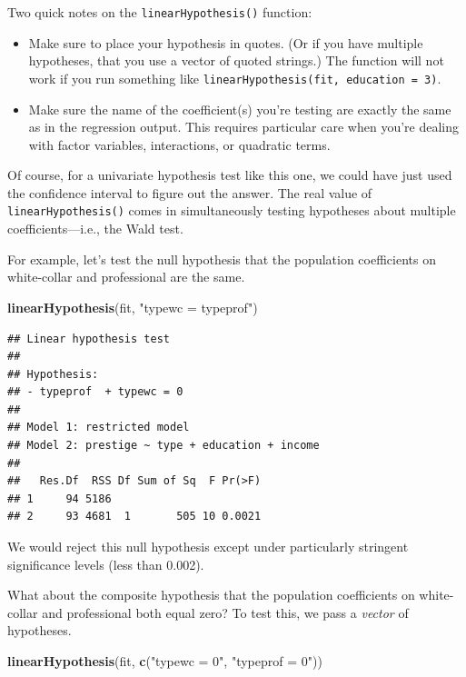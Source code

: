 \documentclass[12pt,oneside,openany]{book}
\newenvironment{Shaded}{\begin{snugshade}}{\end{snugshade}}
\newcommand{\KeywordTok}[1]{\textcolor[rgb]{0.13,0.29,0.53}{\textbf{#1}}}
\newcommand{\StringTok}[1]{\textcolor[rgb]{0.31,0.60,0.02}{#1}}
\newcommand{\NormalTok}[1]{#1}
\begin{document}
Two quick notes on the \texttt{linearHypothesis()} function:

\begin{itemize}
\item
  Make sure to place your hypothesis in quotes. (Or if you have multiple
  hypotheses, that you use a vector of quoted strings.) The function
  will not work if you run something like
  \texttt{linearHypothesis(fit,\ education\ =\ 3)}.
\item
  Make sure the name of the coefficient(s) you're testing are exactly
  the same as in the regression output. This requires particular care
  when you're dealing with factor variables, interactions, or quadratic
  terms.
\end{itemize}

Of course, for a univariate hypothesis test like this one, we could have
just used the confidence interval to figure out the answer. The real
value of \texttt{linearHypothesis()} comes in simultaneously testing
hypotheses about multiple coefficients---i.e., the Wald test.

For example, let's test the null hypothesis that the population
coefficients on white-collar and professional are the same.

\begin{Shaded}
\begin{Highlighting}[]
\KeywordTok{linearHypothesis}\NormalTok{(fit, }\StringTok{"typewc = typeprof"}\NormalTok{)}
\end{Highlighting}
\end{Shaded}

\begin{verbatim}
## Linear hypothesis test
## 
## Hypothesis:
## - typeprof  + typewc = 0
## 
## Model 1: restricted model
## Model 2: prestige ~ type + education + income
## 
##   Res.Df  RSS Df Sum of Sq  F Pr(>F)
## 1     94 5186                       
## 2     93 4681  1       505 10 0.0021
\end{verbatim}

We would reject this null hypothesis except under particularly stringent
significance levels (less than 0.002).

What about the composite hypothesis that the population coefficients on
white-collar and professional both equal zero? To test this, we pass a
\emph{vector} of hypotheses.

\begin{Shaded}
\begin{Highlighting}[]
\KeywordTok{linearHypothesis}\NormalTok{(fit, }\KeywordTok{c}\NormalTok{(}\StringTok{"typewc = 0"}\NormalTok{, }\StringTok{"typeprof = 0"}\NormalTok{))}
\end{Highlighting}
\end{Shaded}
\end{document}
